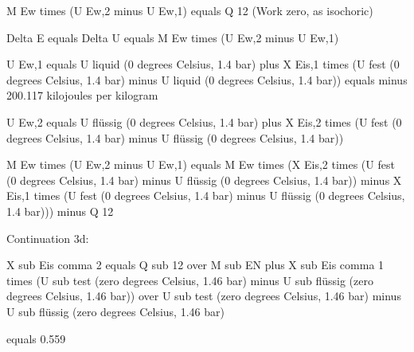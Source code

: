 M Ew times (U Ew,2 minus U Ew,1) equals Q 12 (Work zero, as isochoric)

Delta E equals Delta U equals M Ew times (U Ew,2 minus U Ew,1)

U Ew,1 equals U liquid (0 degrees Celsius, 1.4 bar) plus X Eis,1 times (U fest (0 degrees Celsius, 1.4 bar) minus U liquid (0 degrees Celsius, 1.4 bar)) equals minus 200.117 kilojoules per kilogram

U Ew,2 equals U flüssig (0 degrees Celsius, 1.4 bar) plus X Eis,2 times (U fest (0 degrees Celsius, 1.4 bar) minus U flüssig (0 degrees Celsius, 1.4 bar))

M Ew times (U Ew,2 minus U Ew,1) equals M Ew times (X Eis,2 times (U fest (0 degrees Celsius, 1.4 bar) minus U flüssig (0 degrees Celsius, 1.4 bar)) minus X Eis,1 times (U fest (0 degrees Celsius, 1.4 bar) minus U flüssig (0 degrees Celsius, 1.4 bar))) minus Q 12

Continuation 3d:

X sub Eis comma 2 equals Q sub 12 over M sub EN plus X sub Eis comma 1 times (U sub test (zero degrees Celsius, 1.46 bar) minus U sub flüssig (zero degrees Celsius, 1.46 bar)) over U sub test (zero degrees Celsius, 1.46 bar) minus U sub flüssig (zero degrees Celsius, 1.46 bar)

equals 0.559